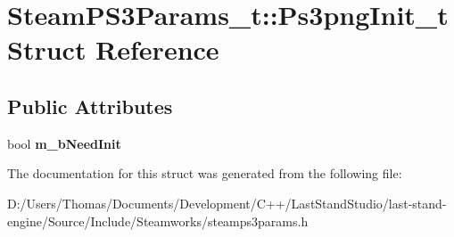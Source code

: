 \hypertarget{structSteamPS3Params__t_1_1Ps3pngInit__t}{}\section{Steam\+P\+S3\+Params\+\_\+t\+:\+:Ps3png\+Init\+\_\+t Struct Reference}
\label{structSteamPS3Params__t_1_1Ps3pngInit__t}
\subsection*{Public Attributes}
\begin{DoxyCompactItemize}
\item 
\hypertarget{structSteamPS3Params__t_1_1Ps3pngInit__t_aa0d6e40579ccf40bd7425e329b1be97e}{}bool {\bfseries m\+\_\+b\+Need\+Init}\label{structSteamPS3Params__t_1_1Ps3pngInit__t_aa0d6e40579ccf40bd7425e329b1be97e}

\end{DoxyCompactItemize}


The documentation for this struct was generated from the following file\+:\begin{DoxyCompactItemize}
\item 
D\+:/\+Users/\+Thomas/\+Documents/\+Development/\+C++/\+Last\+Stand\+Studio/last-\/stand-\/engine/\+Source/\+Include/\+Steamworks/steamps3params.\+h\end{DoxyCompactItemize}

